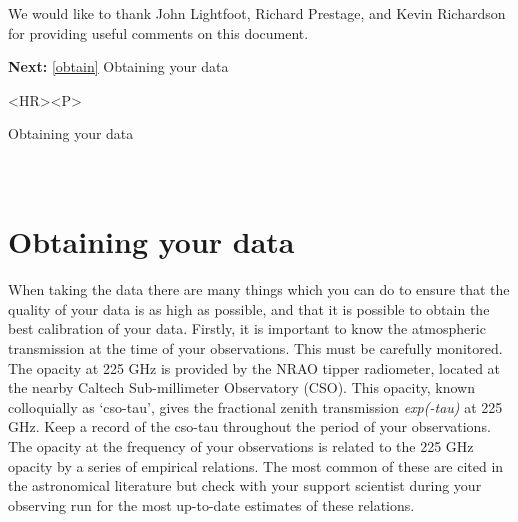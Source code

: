    We would like to thank John Lightfoot, Richard Prestage, and Kevin
   Richardson for providing useful comments on this document.

\begin{latexonly}
{\bf Next:} \ref{obtain} Obtaining your data\\
\end{latexonly}

\begin{htmlonly}
\begin{rawhtml} <HR><P> \end{rawhtml}
{\bf {}} Obtaining your data\\
{\bf {}}\\
{\bf {}}\\
\end{htmlonly}


\section{\label{obtain}Obtaining your data}

   When taking the data there are many things which you can do to ensure
   that the quality of your data is as high as possible, and that it is
   possible to obtain the best calibration of your data. Firstly, it is
   important to know the atmospheric transmission at the time of your
   observations. This must be carefully monitored. The opacity at
   225 GHz is provided by the NRAO tipper radiometer, located at the
   nearby Caltech Sub-millimeter Observatory (CSO). This opacity, known
   colloquially as `cso-tau',
   gives the fractional zenith transmission {\it exp(-tau)\/} at 225 GHz.
   Keep a record of the cso-tau throughout the period of your
   observations. The opacity at the frequency of your observations is
   related to the 225 GHz opacity by a series of empirical relations.
   The most common of these are cited in the astronomical literature
   but check with your support scientist during your observing run for
   the most up-to-date estimates of these relations.

